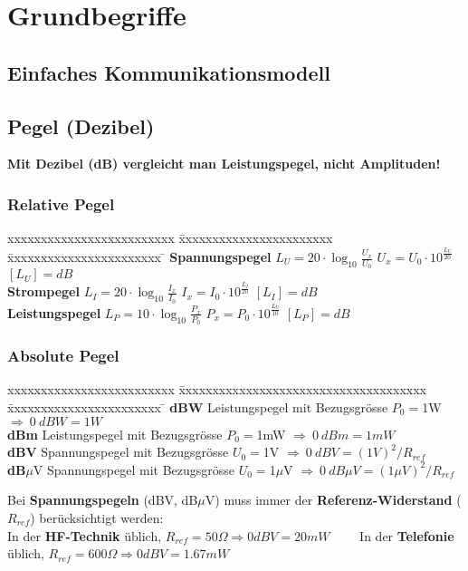 \section{Grundbegriffe}
\subsection{Einfaches Kommunikationsmodell}
\begin{center}
	
\end{center}

\subsection{Pegel (Dezibel)}
\textbf{Mit Dezibel (dB) vergleicht man Leistungspegel, nicht Amplituden!}

\subsubsection{Relative Pegel}
	\begin{tabbing}
	xxxxxxxxxxxxxxxxxxxxxxxxx \= xxxxxxxxxxxxxxxxxxxxxxx  \= xxxxxxxxxxxxxxxxxxxxxxx \=\kill
	\textbf{Spannungspegel} \> $L_U = 20 \cdot \log_{10} \frac{U_x}{U_0}$ \> $U_x = U_0 \cdot
	10^{\frac{L_U}{20}} $ \> $[L_U] = dB$ \\ 
	\textbf{Strompegel} \> $L_I  = 20 \cdot \log_{10} \frac{I_x}{I_0}$ \> $I_x = I_0 \cdot
	10^{\frac{L_I}{20}} $ \> $[L_I] = dB$ \\ 
	\textbf{Leistungspegel} \> $L_P = 10 \cdot \log_{10} \frac{P_x}{P_0}$ \> $P_x = P_0 \cdot
	10^{\frac{L_U}{10}} $ \> $[L_P] = dB$
	\end{tabbing}

\subsubsection{Absolute Pegel}
	\begin{tabbing}
	xxxxxxxxxxxxxxxxxxxxxxxxx \= xxxxxxxxxxxxxxxxxxxxxxxxxxxxxxxxxxxxx  \= xxxxxxxxxxxxxxxxxxxxxxx \=\kill
	\textbf{dBW} \> Leistungspegel mit Bezugsgrösse $P_0 = $1W \> $\Longrightarrow \: 0 \: dBW = 1W$\\
	\textbf{dBm} \> Leistungspegel mit Bezugsgrösse $P_0 = $1mW \> $\Longrightarrow \: 0 \: dBm = 1mW$\\
	\textbf{dBV} \> Spannungspegel mit Bezugsgrösse $U_0 = $1V \> $\Longrightarrow \: 0 \: dBV = (1V)^2/R_{ref}$\\
	\textbf{dB}$\mu$V \> Spannungspegel mit Bezugsgrösse $U_0 = $1$\mu$V \> $\Longrightarrow \: 0 \: dB \mu V = (1 \mu V)^2/R_{ref}$
	\end{tabbing}
Bei \textbf{Spannungspegeln} (dBV, dB$\mu$V) muss immer der \textbf{Referenz-Widerstand} ($R_{ref}$) berücksichtigt werden: \\
In der \textbf{HF-Technik} üblich, $R_{ref} = 50 \Omega \Rightarrow 0 dBV = 20 mW \qquad $
In der \textbf{Telefonie} üblich, $R_{ref} = 600  \Omega \Rightarrow 0 dBV =
1.67 mW$ 

